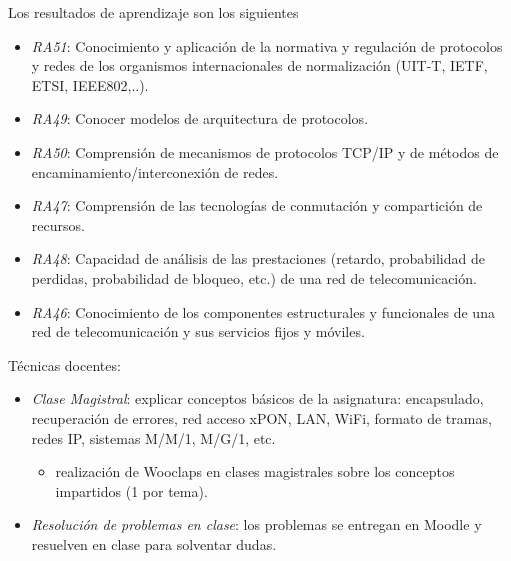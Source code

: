 \documentclass[xcolor=table,xcolor=x11names]{beamer}
\begin{document}
\begin{frame}{\subsecname}

Los resultados de aprendizaje son los siguientes
\begin{itemize}

\item \emph{RA51}: Conocimiento y aplicación de la normativa y regulación de protocolos y redes de los organismos internacionales de normalización (UIT-T, IETF, ETSI, IEEE802,..).

\item \emph{RA49}: Conocer modelos de arquitectura de protocolos.

\item  \emph{RA50}: Comprensión de mecanismos de protocolos TCP/IP y de métodos de encaminamiento/interconexión de redes.

\item \emph{RA47}: Comprensión de las tecnologías de conmutación y compartición de recursos.

\item \emph{RA48}: Capacidad de análisis de las prestaciones (retardo, probabilidad de perdidas, probabilidad de bloqueo, etc.) de una red de telecomunicación.

\item \emph{RA46}: Conocimiento de los componentes estructurales y funcionales de una red de telecomunicación y sus servicios fijos y móviles.

\end{itemize}
\end{frame}









\begin{frame}{\subsecname}
    Técnicas docentes:
    \begin{itemize}
        \item \emph{Clase Magistral}: explicar
            conceptos básicos de la asignatura:
            encapsulado, recuperación de errores,
            red acceso xPON, LAN, WiFi, formato de
            tramas, redes IP, sistemas M/M/1, M/G/1, etc.
            \begin{itemize}
                \item realización de
            Wooclaps en clases magistrales sobre los
            conceptos impartidos (1 por tema).
            \end{itemize}
        \item \emph{Resolución de problemas en clase}:
            los problemas se entregan en Moodle y resuelven
            en clase para solventar dudas.
    \end{itemize}
\end{frame}
\end{document}
